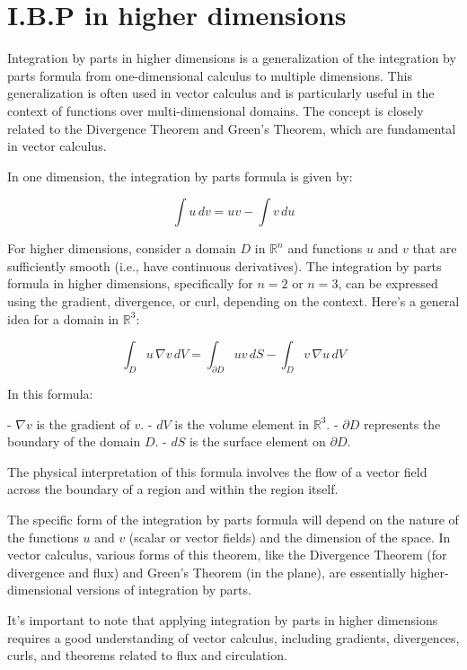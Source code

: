 \documentclass[a4paper,12pt]{article} %
\begin{document}
\section{\textbf{I.B.P in higher dimensions}}
Integration by parts in higher dimensions is a generalization of the integration by parts formula from one-dimensional calculus to multiple dimensions. This generalization is often used in vector calculus and is particularly useful in the context of functions over multi-dimensional domains. The concept is closely related to the Divergence Theorem and Green's Theorem, which are fundamental in vector calculus.

In one dimension, the integration by parts formula is given by:

\[ \int u \, dv = uv - \int v \, du \]

For higher dimensions, consider a domain \( D \) in \( \mathbb{R}^n \) and functions \( u \) and \( v \) that are sufficiently smooth (i.e., have continuous derivatives). The integration by parts formula in higher dimensions, specifically for \( n = 2 \) or \( n = 3 \), can be expressed using the gradient, divergence, or curl, depending on the context. Here's a general idea for a domain in \( \mathbb{R}^3 \):

\[ \int_D u \, \nabla v \, dV = \int_{\partial D} u v \, dS - \int_D v \, \nabla u \, dV \]

In this formula:

- \( \nabla v \) is the gradient of \( v \).
- \( dV \) is the volume element in \( \mathbb{R}^3 \).
- \( \partial D \) represents the boundary of the domain \( D \).
- \( dS \) is the surface element on \( \partial D \).

The physical interpretation of this formula involves the flow of a vector field across the boundary of a region and within the region itself.

The specific form of the integration by parts formula will depend on the nature of the functions \( u \) and \( v \) (scalar or vector fields) and the dimension of the space. In vector calculus, various forms of this theorem, like the Divergence Theorem (for divergence and flux) and Green's Theorem (in the plane), are essentially higher-dimensional versions of integration by parts.

It's important to note that applying integration by parts in higher dimensions requires a good understanding of vector calculus, including gradients, divergences, curls, and theorems related to flux and circulation.
\end{document}

